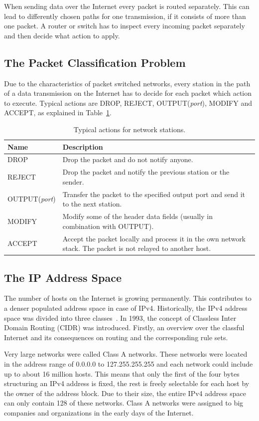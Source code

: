 \documentclass[a4paper,
		12pt,
		parskip=full,
		titlepage
		]{scrartcl}
\begin{document}
When sending data over the Internet every packet is routed separately.
This can lead to differently chosen paths for one transmission, if it consists of more than one packet.
A router or switch has to inspect every incoming packet separately and then decide what action to apply.

\subsection{The Packet Classification Problem}
Due to the characteristics of packet switched networks, every station in the path of a data transmission on the Internet 
has to decide for each packet which action to execute.
Typical actions are DROP, REJECT, OUTPUT(\textit{port}), MODIFY and ACCEPT, as explained in Table~\ref{table:actions}.

\begin{table}
  \centering
  \begin{tabularx}{\textwidth}{l|X}
  Name&Description\\
  \hline
  DROP&Drop the packet and do not notify anyone.\\
  REJECT&Drop the packet and notify the previous station or the sender.\\
  OUTPUT(\textit{port})&Transfer the packet to the specified output port and send it to the next station.\\
  MODIFY&Modify some of the header data fields (usually in combination with OUTPUT).\\
  ACCEPT&Accept the packet locally and process it in the own network stack. The packet is not relayed to another host.\\
  \end{tabularx}
  \caption{Typical actions for network stations.}
  \label{table:actions}
\end{table}

\subsection{The IP Address Space}
The number of hosts on the Internet is growing permanently.
This contributes to a denser populated address space in case of IPv4.
Historically, the IPv4 address space was divided into three classes~\cite{rfc1466}.
In 1993, the concept of Classless Inter Domain Routing (CIDR) was introduced.
Firstly, an overview over the classful Internet and its consequences on routing and the corresponding rule sets.

Very large networks were called Class A networks.
These networks were located in the address range of 0.0.0.0 to 127.255.255.255 and each network could include up to about 16 million hosts.
This means that only the first of the four bytes structuring an IPv4 address 
is fixed, the rest is freely selectable for each host by the owner of the address block.
Due to their size, the entire IPv4 address space can only contain 128 of these networks.
Class A networks were assigned to big companies and organizations in the early days of the Internet.
\end{document}

